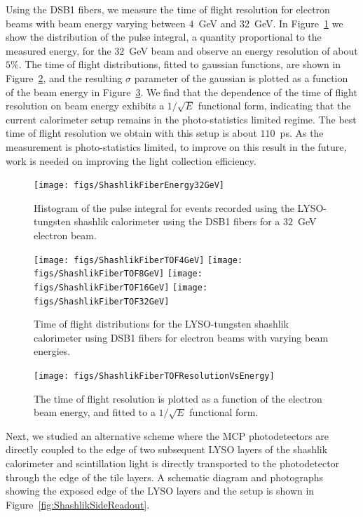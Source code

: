 \documentclass[11pt]{article}
\begin{document}
Using the DSB1 fibers, we measure the time of flight resolution
for electron beams with beam energy varying between $4$~GeV and $32$~GeV.
In Figure~\ref{fig:ShashlikFiberEnergy32GeV} we show the distribution
of the pulse integral, a quantity proportional to the measured energy,
for the $32$~GeV beam and observe an energy resolution of about $5\%$.
The time of flight distributions, fitted to gaussian functions,
are shown in Figure~\ref{fig:ShashlikFiberTOF}, and the resulting
$\sigma$ parameter of the gaussian is plotted as a function of the
beam energy in Figure~\ref{fig:ShashlikFiberTOFResolutionVsEnergy}.
We find that the dependence of the time of flight resolution on
beam energy exhibits a $1/\sqrt{E}$ functional form, indicating
that the current calorimeter setup remains in the photo-statistics
limited regime. The best time of flight resolution we obtain
with this setup is about $110$~ps. As the measurement is photo-statistics
limited, to improve on this result in the future, work is needed
on improving the light collection efficiency. 

\begin{figure}[h] \centering
\texttt{[image: figs/ShashlikFiberEnergy32GeV]} 
\caption{ Histogram of the pulse integral for events recorded using
the LYSO-tungsten shashlik calorimeter using the DSB1 fibers for 
a $32$~GeV electron beam. } 
\label{fig:ShashlikFiberEnergy32GeV}
\end{figure}

\begin{figure}[h] \centering
\texttt{[image: figs/ShashlikFiberTOF4GeV]} 
\texttt{[image: figs/ShashlikFiberTOF8GeV]} 
\texttt{[image: figs/ShashlikFiberTOF16GeV]} 
\texttt{[image: figs/ShashlikFiberTOF32GeV]} 
\caption{ Time of flight distributions for the LYSO-tungsten shashlik calorimeter
using DSB1 fibers for electron beams with varying beam energies. } 
\label{fig:ShashlikFiberTOF}
\end{figure}

\begin{figure}[h] \centering
\texttt{[image: figs/ShashlikFiberTOFResolutionVsEnergy]} 
\caption{ The time of flight resolution is plotted as a function of
the electron beam energy, and fitted to a $1/\sqrt{E}$ functional form. }
\label{fig:ShashlikFiberTOFResolutionVsEnergy}
\end{figure}


Next, we studied an alternative scheme where the MCP photodetectors
are directly coupled to the edge of two subsequent LYSO layers of the
shashlik calorimeter and scintillation light is directly transported 
to the photodetector through the edge of the tile layers. 
A schematic diagram and photographs showing the exposed edge
of the LYSO layers and the setup is shown in Figure~\ref{fig:ShashlikSideReadout}.
\end{document}

